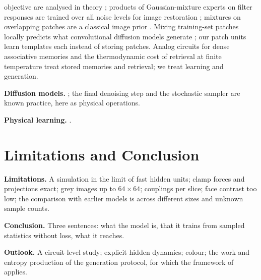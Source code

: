 \begin{plan}
        objective are analysed in theory \citep{shah2023learning}; products
        of Gaussian-mixture experts on filter responses are trained over all
        noise levels for image restoration \citep{zach2024product}; mixtures
        on overlapping patches are a classical image prior
        \citep{zoran2011learning}. Mixing training-set patches locally
        predicts what convolutional diffusion models generate
        \citep{kamb2025analytic}; our patch units learn \Mpatch{} templates
        each instead of storing patches.
        Analog circuits for dense associative memories
        \citep{bacvanski2025dense} and the thermodynamic cost of retrieval at
        finite temperature \citep{rooke2026stochastic} treat stored memories
        and retrieval; we treat learning and generation.
  \item \textbf{Diffusion models.} \citet{song2019generative,ho2020denoising};
        the final denoising step and the stochastic sampler are known practice,
        here as physical operations.
  \item \textbf{Physical learning.}
        \citet{stern2021supervised,dillavou2026imperfection}.
  \item {}
\end{plan}

\section{Limitations and Conclusion}
\label{sec:conclusion}

\begin{plan}
  \item \textbf{Limitations.} A simulation in the limit of fast hidden units;
        clamp forces and projections exact; grey images up to $64\times64$;
        \paramsCelebLow{} couplings per slice; face contrast too low; the
        comparison with earlier models is across different sizes and unknown
        sample counts.
  \item \textbf{Conclusion.} Three sentences: what the model is, that it trains
        from sampled statistics without loss, what it reaches.
  \item \textbf{Outlook.} A circuit-level study; explicit hidden dynamics;
        colour; the work and entropy production of the generation protocol,
        for which the framework of \citet{rooke2026stochastic} applies.
\end{plan}

